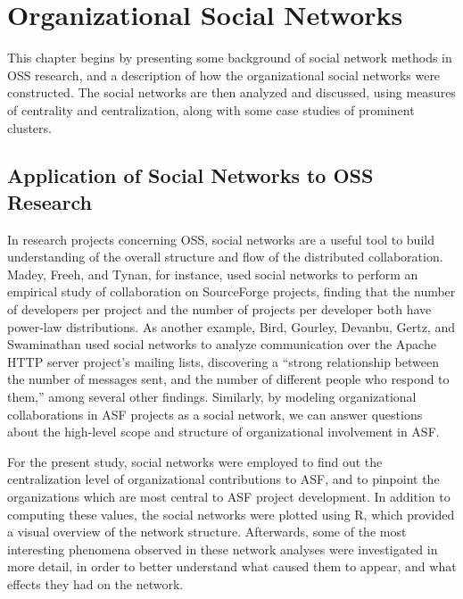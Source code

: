 \chapter{Organizational Social Networks}
This chapter begins by presenting some background of social network methods in OSS research, and a description of how the organizational social networks were constructed. The social networks are then analyzed and discussed, using measures of centrality and centralization, along with some case studies of prominent clusters.

\section{Application of Social Networks to OSS Research}
In research projects concerning OSS, social networks are a useful tool to build understanding of the overall structure and flow of the distributed collaboration. Madey, Freeh, and Tynan\cite{madey2002open}, for instance, used social networks to perform an empirical study of collaboration on SourceForge projects, finding that the number of developers per project and the number of projects per developer both have power-law distributions. As another example, Bird, Gourley, Devanbu, Gertz, and Swaminathan\cite{bird2006mining} used social networks to analyze communication over the Apache HTTP server project's mailing lists, discovering a ``strong relationship between the number of messages sent, and the number of different people who respond to them,'' among several other findings.
 Similarly, by modeling organizational collaborations in ASF projects as a social network, we can answer questions about the high-level scope and structure of organizational involvement in ASF. 

For the present study, social networks were employed to find out the centralization level of organizational contributions to ASF, and to pinpoint the organizations which are most central to ASF project development. In addition to computing these values, the social networks were plotted using R, which provided a visual overview of the network structure. Afterwards, some of the most interesting phenomena observed in these network analyses were investigated in more detail, in order to better understand what caused them to appear, and what effects they had on the network.
